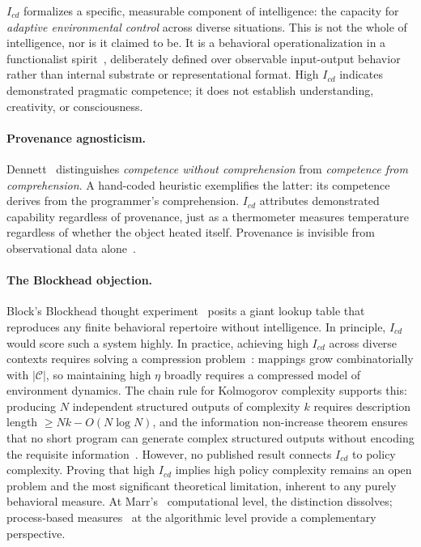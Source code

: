 \documentclass[runningheads,a4paper]{llncs}
\begin{document}
$I_{cd}$ formalizes a specific, measurable component of intelligence: the capacity for \emph{adaptive environmental control} across diverse situations. This is not the whole of intelligence, nor is it claimed to be. It is a behavioral operationalization in a functionalist spirit~\cite{putnam1967nature,varela1991embodied}, deliberately defined over observable input-output behavior rather than internal substrate or representational format. High $I_{cd}$ indicates demonstrated pragmatic competence; it does not establish understanding, creativity, or consciousness.

\paragraph{Provenance agnosticism.} Dennett~\cite{dennett2017bacteria} distinguishes \emph{competence without comprehension} from \emph{competence from comprehension}. A hand-coded heuristic exemplifies the latter: its competence derives from the programmer's comprehension. $I_{cd}$ attributes demonstrated capability regardless of provenance, just as a thermometer measures temperature regardless of whether the object heated itself. Provenance is invisible from observational data alone~\cite{searle1980minds}.

\paragraph{The Blockhead objection.} Block's Blockhead thought experiment~\cite{block1981troubles} posits a giant lookup table that reproduces any finite behavioral repertoire without intelligence. In principle, $I_{cd}$ would score such a system highly. In practice, achieving high $I_{cd}$ across diverse contexts requires solving a compression problem~\cite{schmidhuber2009driven}: mappings grow combinatorially with $|\mathcal{C}|$, so maintaining high $\eta$ broadly requires a compressed model of environment dynamics. The chain rule for Kolmogorov complexity supports this: producing $N$ independent structured outputs of complexity $k$ requires description length $\geq Nk - O(N \log N)$, and the information non-increase theorem ensures that no short program can generate complex structured outputs without encoding the requisite information~\cite{li2019introduction}. However, no published result connects $I_{cd}$ to policy complexity. Proving that high $I_{cd}$ implies high policy complexity remains an open problem and the most significant theoretical limitation, inherent to any purely behavioral measure. At Marr's~\cite{marr1982vision} computational level, the distinction dissolves; process-based measures~\cite{chollet2019measure,wang2006rigid} at the algorithmic level provide a complementary perspective.
\end{document}
